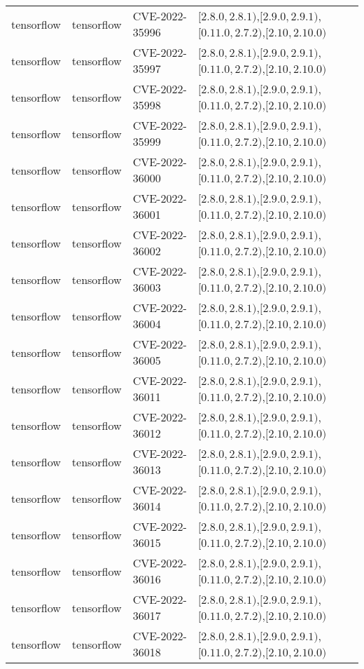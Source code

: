\begin{tabular}{llll}
tensorflow & tensorflow & CVE-2022-35996 & $[2.8.0,2.8.1)$,$[2.9.0,2.9.1)$,$[0.11.0,2.7.2)$,$[2.10,2.10.0)$ \\
tensorflow & tensorflow & CVE-2022-35997 & $[2.8.0,2.8.1)$,$[2.9.0,2.9.1)$,$[0.11.0,2.7.2)$,$[2.10,2.10.0)$ \\
tensorflow & tensorflow & CVE-2022-35998 & $[2.8.0,2.8.1)$,$[2.9.0,2.9.1)$,$[0.11.0,2.7.2)$,$[2.10,2.10.0)$ \\
tensorflow & tensorflow & CVE-2022-35999 & $[2.8.0,2.8.1)$,$[2.9.0,2.9.1)$,$[0.11.0,2.7.2)$,$[2.10,2.10.0)$ \\
tensorflow & tensorflow & CVE-2022-36000 & $[2.8.0,2.8.1)$,$[2.9.0,2.9.1)$,$[0.11.0,2.7.2)$,$[2.10,2.10.0)$ \\
tensorflow & tensorflow & CVE-2022-36001 & $[2.8.0,2.8.1)$,$[2.9.0,2.9.1)$,$[0.11.0,2.7.2)$,$[2.10,2.10.0)$ \\
tensorflow & tensorflow & CVE-2022-36002 & $[2.8.0,2.8.1)$,$[2.9.0,2.9.1)$,$[0.11.0,2.7.2)$,$[2.10,2.10.0)$ \\
tensorflow & tensorflow & CVE-2022-36003 & $[2.8.0,2.8.1)$,$[2.9.0,2.9.1)$,$[0.11.0,2.7.2)$,$[2.10,2.10.0)$ \\
tensorflow & tensorflow & CVE-2022-36004 & $[2.8.0,2.8.1)$,$[2.9.0,2.9.1)$,$[0.11.0,2.7.2)$,$[2.10,2.10.0)$ \\
tensorflow & tensorflow & CVE-2022-36005 & $[2.8.0,2.8.1)$,$[2.9.0,2.9.1)$,$[0.11.0,2.7.2)$,$[2.10,2.10.0)$ \\
tensorflow & tensorflow & CVE-2022-36011 & $[2.8.0,2.8.1)$,$[2.9.0,2.9.1)$,$[0.11.0,2.7.2)$,$[2.10,2.10.0)$ \\
tensorflow & tensorflow & CVE-2022-36012 & $[2.8.0,2.8.1)$,$[2.9.0,2.9.1)$,$[0.11.0,2.7.2)$,$[2.10,2.10.0)$ \\
tensorflow & tensorflow & CVE-2022-36013 & $[2.8.0,2.8.1)$,$[2.9.0,2.9.1)$,$[0.11.0,2.7.2)$,$[2.10,2.10.0)$ \\
tensorflow & tensorflow & CVE-2022-36014 & $[2.8.0,2.8.1)$,$[2.9.0,2.9.1)$,$[0.11.0,2.7.2)$,$[2.10,2.10.0)$ \\
tensorflow & tensorflow & CVE-2022-36015 & $[2.8.0,2.8.1)$,$[2.9.0,2.9.1)$,$[0.11.0,2.7.2)$,$[2.10,2.10.0)$ \\
tensorflow & tensorflow & CVE-2022-36016 & $[2.8.0,2.8.1)$,$[2.9.0,2.9.1)$,$[0.11.0,2.7.2)$,$[2.10,2.10.0)$ \\
tensorflow & tensorflow & CVE-2022-36017 & $[2.8.0,2.8.1)$,$[2.9.0,2.9.1)$,$[0.11.0,2.7.2)$,$[2.10,2.10.0)$ \\
tensorflow & tensorflow & CVE-2022-36018 & $[2.8.0,2.8.1)$,$[2.9.0,2.9.1)$,$[0.11.0,2.7.2)$,$[2.10,2.10.0)$ \\

\end{tabular}
